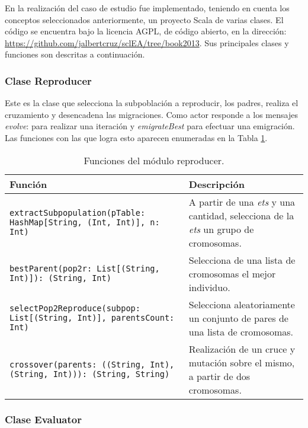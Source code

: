 
En la realización del caso de estudio fue implementado, teniendo en cuenta los conceptos seleccionados anteriormente, un proyecto Scala de varias clases. El código se encuentra bajo la licencia AGPL, de código abierto, en la dirección: \url{https://github.com/jalbertcruz/sclEA/tree/book2013}. Sus principales clases y funciones son descritas a continuación.


\subsubsection{Clase Reproducer}

Este es la clase que selecciona la subpoblación a reproducir, los padres, realiza el cruzamiento y desencadena las migraciones. Como actor responde a los mensajes {\em evolve}: para realizar una iteración y {\em emigrateBest} para efectuar una emigración. Las funciones con las que logra esto aparecen enumeradas en la Tabla \ref{tb:scl:reproducer}.

\begin{table}
  \caption{Funciones del módulo reproducer.}\label{tb:scl:reproducer}
  \centering
\begin{tabular}{|p{5cm}|p{7cm}|}
  \hline
   \textbf{Función} &  \textbf{Descripción} \\
  \hline
  {\tt extractSubpopulation(pTable: HashMap[String, (Int, Int)], n: Int) } & A partir de una {\em ets} y una cantidad, selecciona de la {\em ets} un grupo de cromosomas. \\
  \hline
  {\tt bestParent(pop2r: List[(String, Int)]): (String, Int)} & Selecciona de una lista de cromosomas el mejor individuo. \\
  \hline
 {\tt selectPop2Reproduce(subpop: List[(String, Int)], parentsCount: Int)} & Selecciona aleatoriamente un conjunto de pares de una lista de cromosomas. \\
  \hline
  {\tt crossover(parents: ((String, Int), (String, Int))): (String, String)} & Realización de un cruce y mutación sobre el mismo, a partir de dos cromosomas. \\
  \hline
\end{tabular}
\end{table}


\subsubsection{Clase Evaluator}

